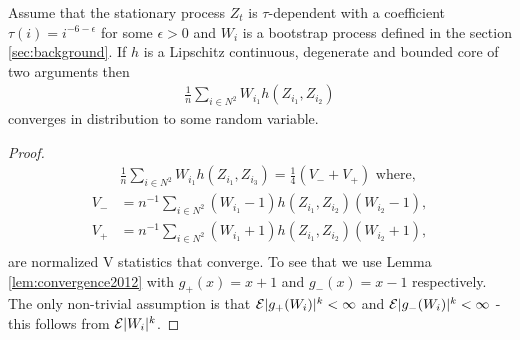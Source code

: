 \begin{lemma}
\label{lem:oneWtrick}
Assume that the stationary process $Z_t$ is $\tau$-dependent with a coefficient $\tau(i) = i^{-6-\epsilon}$ for some $\epsilon>0$ and $W_i$ is a bootstrap process defined in the section \ref{sec:background}. If $h$ is a Lipschitz continuous, degenerate and bounded core of two arguments then 
\begin{align}
\frac{1}{n} \sum_{i \in N^2} W_{i_1} h(Z_{i_1},Z_{i_2}) 
\end{align}
converges in distribution to some random variable.
\end{lemma}
\begin{proof}
\begin{align}
\label{eq:h2eq1}
& \frac{1}{n} \sum_{i \in N^2} W_{i_1}  h(Z_{i_1},Z_{i_3}) = \frac 1 4 (V_{-} + V_{+}) \text{ where,} \\   
V_{-} &= n^{-1} \sum_{i \in N^2} (W_{i_1}-1)h(Z_{i_1},Z_{i_2})(W_{i_2}-1), \\
V_{+} &= n^{-1} \sum_{i \in N^2}  (W_{i_1}+1)h(Z_{i_1},Z_{i_2})(W_{i_2}+1), \\ 
\end{align}
are normalized V statistics that converge. To see that we use Lemma \ref{lem:convergence2012} with $g_{+}(x)=x+1$ and $g_{-}(x)=x-1$ respectively. The only non-trivial assumption is that $\mathcal{E}|g_{+}(W_i)|^k < \infty$ and $\mathcal{E}|g_{-}(W_i)|^k<\infty$  - this follows from $\mathcal{E} |W_i|^k$. 
\end{proof}




